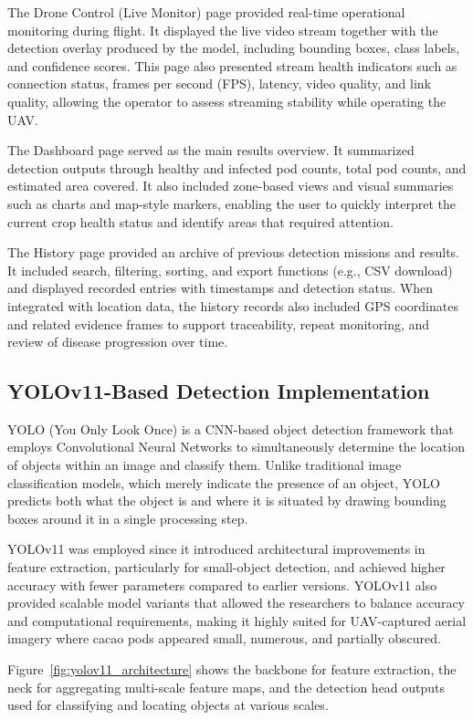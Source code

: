 The Drone Control (Live Monitor) page provided real-time operational monitoring during flight. It displayed the live video stream together with the detection overlay produced by the model, including bounding boxes, class labels, and confidence scores. This page also presented stream health indicators such as connection status, frames per second (FPS), latency, video quality, and link quality, allowing the operator to assess streaming stability while operating the UAV.

The Dashboard page served as the main results overview. It summarized detection outputs through healthy and infected pod counts, total pod counts, and estimated area covered. It also included zone-based views and visual summaries such as charts and map-style markers, enabling the user to quickly interpret the current crop health status and identify areas that required attention.

The History page provided an archive of previous detection missions and results. It included search, filtering, sorting, and export functions (e.g., CSV download) and displayed recorded entries with timestamps and detection status. When integrated with location data, the history records also included GPS coordinates and related evidence frames to support traceability, repeat monitoring, and review of disease progression over time.

\subsection{YOLOv11-Based Detection Implementation}
YOLO (You Only Look Once) is a CNN-based object detection framework that employs Convolutional Neural Networks to simultaneously determine the location of objects within an image and classify them. Unlike traditional image classification models, which merely indicate the presence of an object, YOLO predicts both what the object is and where it is situated by drawing bounding boxes around it in a single processing step.

YOLOv11 was employed since it introduced architectural improvements in feature extraction, particularly for small-object detection, and achieved higher accuracy with fewer parameters compared to earlier versions. YOLOv11 also provided scalable model variants that allowed the researchers to balance accuracy and computational requirements, making it highly suited for UAV-captured aerial imagery where cacao pods appeared small, numerous, and partially obscured.

Figure~\ref{fig:yolov11_architecture} shows the backbone for feature extraction, the neck for aggregating multi-scale feature maps, and the detection head outputs used for classifying and locating objects at various scales.

